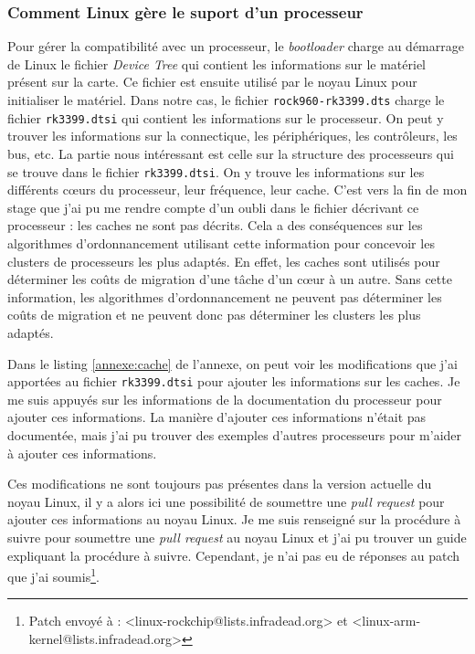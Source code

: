 \subsubsection{Comment Linux gère le suport d'un processeur}

Pour gérer la compatibilité avec un processeur, le \textit{bootloader} charge au démarrage de Linux le fichier \textit{Device Tree} qui contient les informations sur le matériel présent sur la carte. Ce fichier est ensuite utilisé par le noyau Linux pour initialiser le matériel. Dans notre cas, le fichier \texttt{rock960-rk3399.dts} charge le fichier \texttt{rk3399.dtsi} qui contient les informations sur le processeur. On peut y trouver les informations sur la connectique, les périphériques, les contrôleurs, les bus, etc.
La partie nous intéressant est celle sur la structure des processeurs qui se trouve dans le fichier \texttt{rk3399.dtsi}. On y trouve les informations sur les différents cœurs du processeur, leur fréquence, leur cache. C'est vers la fin de mon stage que j'ai pu me rendre compte d'un oubli dans le fichier décrivant ce processeur : les caches ne sont pas décrits. Cela a des conséquences sur les algorithmes d'ordonnancement utilisant cette information pour concevoir les clusters de processeurs les plus adaptés. En effet, les caches sont utilisés pour déterminer les coûts de migration d'une tâche d'un cœur à un autre. Sans cette information, les algorithmes d'ordonnancement ne peuvent pas déterminer les coûts de migration et ne peuvent donc pas déterminer les clusters les plus adaptés. 

Dans le listing \ref{annexe:cache} de l'annexe, on peut voir les modifications que j'ai apportées au fichier \texttt{rk3399.dtsi} pour ajouter les informations sur les caches. Je me suis appuyés sur les informations de la documentation du processeur pour ajouter ces informations. La manière d'ajouter ces informations n'était pas documentée, mais j'ai pu trouver des exemples d'autres processeurs pour m'aider à ajouter ces informations.

Ces modifications ne sont toujours pas présentes dans la version actuelle du noyau Linux, il y a alors ici une possibilité de soumettre une \textit{pull request} pour ajouter ces informations au noyau Linux. Je me suis renseigné sur la procédure à suivre pour soumettre une \textit{pull request} au noyau Linux et j'ai pu trouver un guide\cite{kernel-contribute} expliquant la procédure à suivre. Cependant, je n'ai pas eu de réponses au patch que j'ai soumis\footnote{Patch envoyé à : <linux-rockchip@lists.infradead.org> et <linux-arm-kernel@lists.infradead.org>}.


